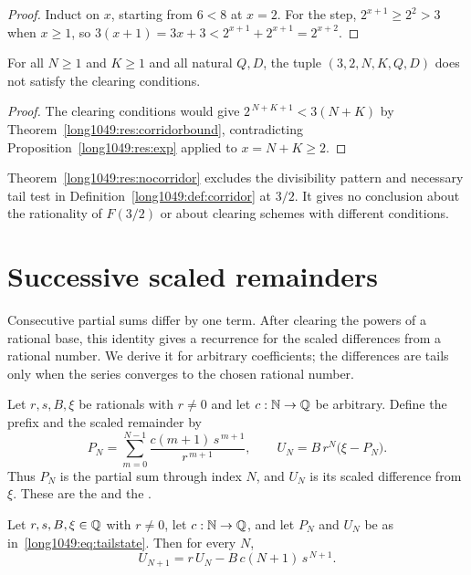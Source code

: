 \documentclass[11pt]{article}
\begin{document}
\begin{proof}
Induct on $x$, starting from $6<8$ at $x=2$.  For the step, $2^{x+1}\ge2^{2}>3$ when
$x\ge1$, so $3(x+1)=3x+3<2^{x+1}+2^{x+1}=2^{x+2}$.
\end{proof}

\begin{theorem}\label{long1049:res:nocorridor}
For all $N\ge1$ and $K\ge1$ and all natural $Q,D$, the tuple
$(3,2,N,K,Q,D)$ does not satisfy the clearing conditions.
\end{theorem}

\begin{proof}
The clearing conditions would give $2^{\,N+K+1}<3(N+K)$ by
Theorem~\ref{long1049:res:corridorbound}, contradicting Proposition~\ref{long1049:res:exp}
applied to $x=N+K\ge2$.
\end{proof}

Theorem~\ref{long1049:res:nocorridor} excludes the divisibility pattern and
necessary tail test in Definition~\ref{long1049:def:corridor} at $3/2$.
It gives no conclusion about the rationality of $F(3/2)$ or about
clearing schemes with different conditions.

\section{Successive scaled remainders}\label{long1049:sec:tail}

Consecutive partial sums differ by one term. After clearing the
powers of a rational base, this identity gives a recurrence for
the scaled differences from a rational number. We derive it for
arbitrary coefficients; the differences are tails only when the
series converges to the chosen rational number.

Let $r,s,B,\xi$ be rationals with $r\ne0$ and let $c:\mathbb{N}\to\mathbb{Q}$ be arbitrary.
Define the prefix and the scaled remainder by
\[
 P_N=\sum_{m=0}^{N-1}\frac{c(m+1)\,s^{\,m+1}}{r^{\,m+1}},
 \qquad
 U_N=B\,r^{N}\bigl(\xi-P_N\bigr).
\tag{$\ast$}\label{long1049:eq:tailstate}
\]
Thus $P_N$ is the partial sum through index $N$, and $U_N$ is its
scaled difference from $\xi$. These are the
 and the
.

\begin{theorem}\label{long1049:res:tailrec}
Let $r,s,B,\xi\in\mathbb{Q}$ with $r\ne0$, let $c:\mathbb{N}\to\mathbb{Q}$, and let $P_N$ and $U_N$ be as
in~\eqref{long1049:eq:tailstate}.  Then for every $N$,
\[
 U_{N+1}=r\,U_N-B\,c(N+1)\,s^{\,N+1}.
\]
\end{theorem}
\end{document}
